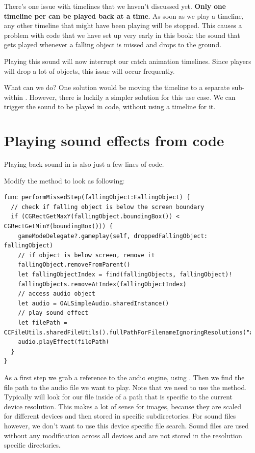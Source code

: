 There's one issue with timelines that we haven't discussed yet. \textbf{Only one
timeline per \ccbfile{} can be played back at a time}. As soon as we play a
timeline, any other timeline that might have been playing will be stopped. This causes a problem
with code that we have set up very early in this book: the sound that gets
played whenever a falling object is missed and drops to the ground.

Playing this sound will now interrupt our catch animation timelines. Since
players will drop a lot of objects, this issue will occur frequently.

What can we do? One solution would be moving the timeline to a separate
sub-\ccbfile{} within . However, there is luckily a
simpler solution for this use case. We can trigger the sound to be played in
code, without using a timeline for it.

\section{Playing sound effects from code}
Playing back sound in \cocos{} is also just a few lines of code.

\begin{leftbar}
Modify the  method to look as following:
\begin{lstlisting}
func performMissedStep(fallingObject:FallingObject) {
  // check if falling object is below the screen boundary
  if (CGRectGetMaxY(fallingObject.boundingBox()) < CGRectGetMinY(boundingBox())) {
    gameModeDelegate?.gameplay(self, droppedFallingObject: fallingObject)
    // if object is below screen, remove it
    fallingObject.removeFromParent()
    let fallingObjectIndex = find(fallingObjects, fallingObject)!
    fallingObjects.removeAtIndex(fallingObjectIndex)
    // access audio object
    let audio = OALSimpleAudio.sharedInstance()
    // play sound effect
    let filePath = CCFileUtils.sharedFileUtils().fullPathForFilenameIgnoringResolutions("assets/drop.caf")
    audio.playEffect(filePath)
  }
}
\end{lstlisting} 
\end{leftbar}

As a first step we grab a reference to the audio engine, using
. Then we find the file path to the
audio file we want to play. Note that we need to use the
 method. Typically
 will look for our file inside of a path that is
specific to the current device resolution. This makes a lot of sense for images,
because they are scaled for different devices and then stored in specific
subdirectories. For sound files however, we don't want to use this device
specific file search. Sound files are used without any modification across all
devices and are not stored in the resolution specific directories.

